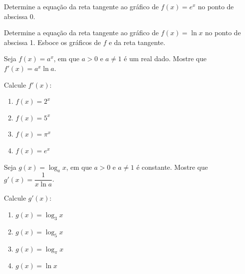\begin{exercicio}[1]
\label{ex:7.4.1}
Determine a equação da reta tangente ao gráfico de $f(x) = e^x$ no ponto de abscissa 0.
\end{exercicio}

\begin{exercicio}[2]
\label{ex:7.4.2}
Determine a equação da reta tangente ao gráfico de $f(x) = \ln x$ no ponto de abscissa 1. Esboce os gráficos de $f$ e da reta tangente.
\end{exercicio}

\begin{exercicio}[3]
\label{ex:7.4.3}
Seja $f(x) = a^x$, em que $a > 0$ e $a \neq 1$ é um real dado. Mostre que $f'(x) = a^x \ln a$.
\end{exercicio}

\begin{exercicio}[4]
\label{ex:7.4.4}
Calcule $f'(x)$:
\begin{enumerate}[label=\alph*)]
    \item $f(x) = 2^x$
    \item $f(x) = 5^x$
    \item $f(x) = \pi^x$
    \item $f(x) = e^x$
\end{enumerate}
\end{exercicio}

\begin{exercicio}[5]
\label{ex:7.4.5}
Seja $g(x) = \log_a x$, em que $a > 0$ e $a \neq 1$ é constante. Mostre que $g'(x) = \dfrac{1}{x \ln a}$.
\end{exercicio}

\begin{exercicio}[6]
\label{ex:7.4.6}
Calcule $g'(x)$:
\begin{enumerate}[label=\alph*)]
    \item $g(x) = \log_3 x$
    \item $g(x) = \log_5 x$
    \item $g(x) = \log_\pi x$
    \item $g(x) = \ln x$
\end{enumerate}
\end{exercicio}

\clearpage

